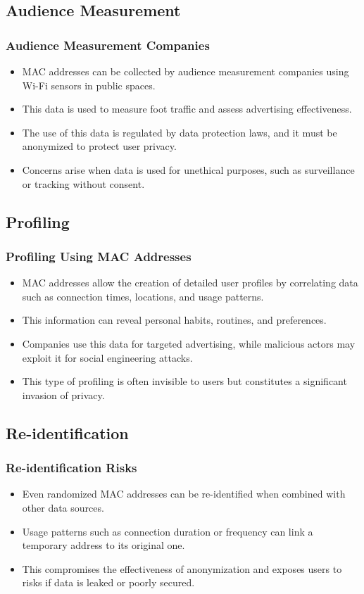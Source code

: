 \documentclass[
english,
svgnames,
notes=hide,
12pt]{beamer}
\begin{document}
\begin{frame}
  \section{Audience Measurement}
  \frametitle{Audience Measurement Companies}
  \begin{itemize}
    \item MAC addresses can be collected by audience measurement companies using Wi-Fi sensors in public spaces. \pause
    \item This data is used to measure foot traffic and assess advertising effectiveness. \pause
    \item The use of this data is regulated by data protection laws, and it must be anonymized to protect user privacy. \pause
    \item Concerns arise when data is used for unethical purposes, such as surveillance or tracking without consent. 
  \end{itemize}
\end{frame}

\begin{frame}
  \section{Profiling}
  \frametitle{Profiling Using MAC Addresses}
  \begin{itemize}
    \item MAC addresses allow the creation of detailed user profiles by correlating data such as connection times, locations, and usage patterns. \pause
    \item This information can reveal personal habits, routines, and preferences. \pause
    \item Companies use this data for targeted advertising, while malicious actors may exploit it for social engineering attacks. \pause
    \item This type of profiling is often invisible to users but constitutes a significant invasion of privacy. 
  \end{itemize}
\end{frame}

\begin{frame}
  \section{Re-identification}
  \frametitle{Re-identification Risks}
  \begin{itemize}
    \item Even randomized MAC addresses can be re-identified when combined with other data sources. \pause
    \item Usage patterns such as connection duration or frequency can link a temporary address to its original one. \pause
    \item This compromises the effectiveness of anonymization and exposes users to risks if data is leaked or poorly secured. 
  \end{itemize}
\end{frame}
\end{document}
